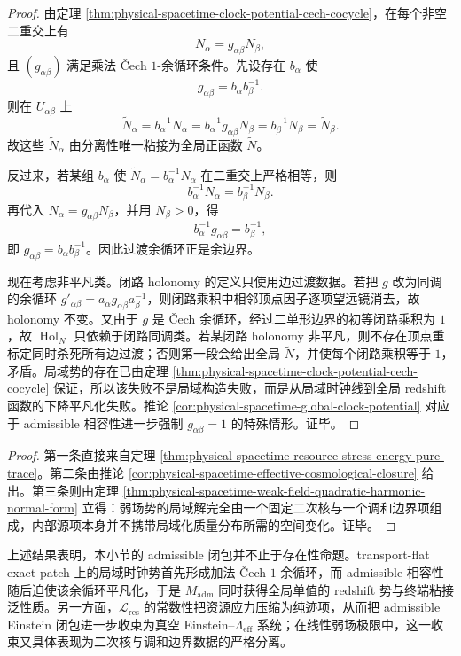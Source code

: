 \begin{proof}
由定理 \ref{thm:physical-spacetime-clock-potential-cech-cocycle}，在每个非空二重交上有
\[
N_\alpha=g_{\alpha\beta}N_\beta,
\]
且 \((g_{\alpha\beta})\) 满足乘法 \v{C}ech \(1\)-余循环条件。先设存在 \(b_\alpha\) 使
\[
g_{\alpha\beta}=b_\alpha b_\beta^{-1}.
\]
则在 \(U_{\alpha\beta}\) 上
\[
\widetilde N_\alpha=b_\alpha^{-1}N_\alpha
=b_\alpha^{-1}g_{\alpha\beta}N_\beta
=b_\beta^{-1}N_\beta
=\widetilde N_\beta.
\]
故这些 \(\widetilde N_\alpha\) 由分离性唯一粘接为全局正函数 \(\widetilde N\)。

反过来，若某组 \(b_\alpha\) 使 \(\widetilde N_\alpha=b_\alpha^{-1}N_\alpha\) 在二重交上严格相等，则
\[
b_\alpha^{-1}N_\alpha=b_\beta^{-1}N_\beta.
\]
再代入 \(N_\alpha=g_{\alpha\beta}N_\beta\)，并用 \(N_\beta>0\)，得
\[
b_\alpha^{-1}g_{\alpha\beta}=b_\beta^{-1},
\]
即 \(g_{\alpha\beta}=b_\alpha b_\beta^{-1}\)。因此过渡余循环正是余边界。

现在考虑非平凡类。闭路 holonomy 的定义只使用边过渡数据。若把 \(g\) 改为同调的余循环 \(g'_{\alpha\beta}=a_\alpha g_{\alpha\beta}a_\beta^{-1}\)，则闭路乘积中相邻顶点因子逐项望远镜消去，故 holonomy 不变。又由于 \(g\) 是 \v{C}ech 余循环，经过二单形边界的初等闭路乘积为 \(1\)，故 \(\operatorname{Hol}_N\) 只依赖于闭路同调类。若某闭路 holonomy 非平凡，则不存在顶点重标定同时杀死所有边过渡；否则第一段会给出全局 \(\widetilde N\)，并使每个闭路乘积等于 \(1\)，矛盾。局域势的存在已由定理 \ref{thm:physical-spacetime-clock-potential-cech-cocycle} 保证，所以该失败不是局域构造失败，而是从局域时钟线到全局 redshift 函数的下降平凡化失败。推论 \ref{cor:physical-spacetime-global-clock-potential} 对应于 admissible 相容性进一步强制 \(g_{\alpha\beta}=1\) 的特殊情形。证毕。
\end{proof}


\begin{proof}
第一条直接来自定理 \ref{thm:physical-spacetime-resource-stress-energy-pure-trace}。第二条由推论 \ref{cor:physical-spacetime-effective-cosmological-closure} 给出。第三条则由定理 \ref{thm:physical-spacetime-weak-field-quadratic-harmonic-normal-form} 立得：弱场势的局域解完全由一个固定二次核与一个调和边界项组成，内部源项本身并不携带局域化质量分布所需的空间变化。证毕。
\end{proof}

上述结果表明，本小节的 admissible 闭包并不止于存在性命题。transport-flat exact patch 上的局域时钟势首先形成加法 \v{C}ech \(1\)-余循环，而 admissible 相容性随后迫使该余循环平凡化，于是 \(M_{\mathrm{adm}}\) 同时获得全局单值的 redshift 势与终端粘接泛性质。另一方面，\(\mathcal L_{\mathrm{res}}\) 的常数性把资源应力压缩为纯迹项，从而把 admissible Einstein 闭包进一步收束为真空 Einstein--\(\Lambda_{\mathrm{eff}}\) 系统；在线性弱场极限中，这一收束又具体表现为二次核与调和边界数据的严格分离。

